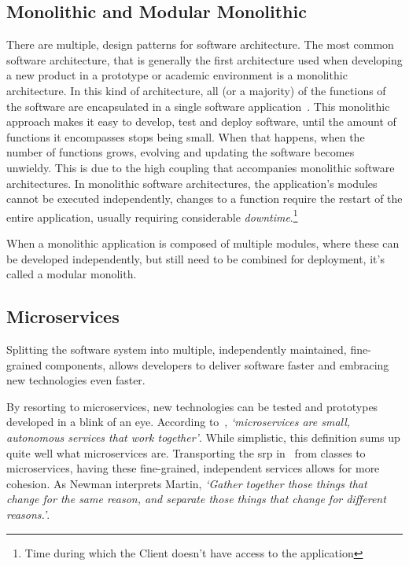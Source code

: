 \subsection{Monolithic and Modular Monolithic}\label{state-of-the-art:ss:monolithic-or-modular-and-their-differences}

There are multiple, design patterns for software architecture. The most common software architecture, that is generally the first architecture used when developing a new product in a prototype or academic environment is a monolithic architecture. In this kind of architecture, all (or a majority) of the functions of the software are encapsulated in a single software application~\Parencite{chen_li_li_2017}. This monolithic approach makes it easy to develop, test and deploy software, until the amount of functions it encompasses stops being small. When that happens, when the number of functions grows, evolving and updating the software becomes unwieldy. This is due to the high coupling that accompanies monolithic software architectures. In monolithic software architectures, the application's modules cannot be executed independently, changes to a function require the restart of the entire application, usually requiring considerable \textit{downtime}.\footnote{\label{foot:downtime}Time during which the Client doesn't have access to the application}



When a monolithic application is composed of multiple modules, where these can be developed independently, but still need to be combined for deployment, it's called a modular monolith. 




\subsection{Microservices}\label{state-of-the-art:ss:microservices}



Splitting the software system into multiple, independently maintained, fine-grained components, allows developers to deliver software faster and embracing new technologies even faster. 

By resorting to microservices, new technologies can be tested and prototypes developed in a blink of an eye.
According to~\Parencite{newman_2015}, \textit{`microservices are small, autonomous services that work together'}. While simplistic, this definition sums up quite well what microservices are. Transporting the \gls{srp} in~\Parencite{martin_2014} from classes to microservices, having these fine-grained, independent services allows for more cohesion. As Newman interprets Martin, \textit{`Gather together those things that change for the
same reason, and separate those things that change for different reasons.'}.

